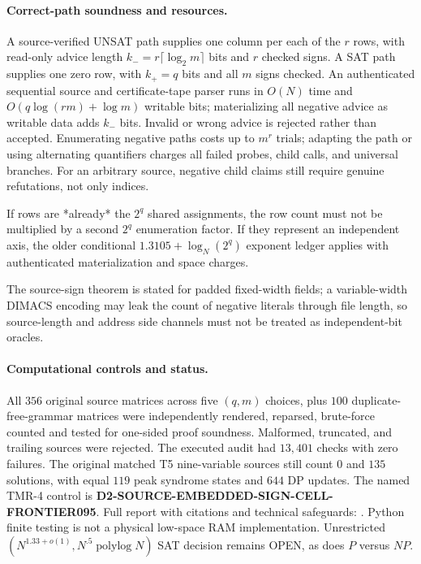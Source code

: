 \documentclass[11pt]{article}
\begin{document}
\paragraph{Correct-path soundness and resources.}
A source-verified UNSAT path supplies one column
per each of the $r$ rows, with read-only advice length
$k_-=r\lceil\log_2m\rceil$ bits and $r$ checked signs.
A SAT path supplies one zero row, with $k_+=q$
bits and all $m$ signs checked. An authenticated
sequential source and certificate-tape parser runs
in $O(N)$ time and $O(q\log(rm)+\log m)$
writable bits; materializing all negative advice
as writable data adds $k_-$ bits. Invalid or wrong
advice is rejected rather than accepted. Enumerating
negative paths costs up to $m^r$ trials; adapting
the path or using alternating quantifiers charges
all failed probes, child calls, and universal branches.
For an arbitrary source, negative child claims still
require genuine refutations, not only indices.

If rows are *already* the $2^q$ shared assignments,
the row count must not be multiplied by a second
$2^q$ enumeration factor. If they represent an
independent axis, the older conditional
$1.3105+\log_N(2^q)$ exponent ledger applies
with authenticated materialization and space charges.

The source-sign theorem is stated for padded fixed-width fields; a variable-width DIMACS encoding may leak the count of negative literals through file length, so source-length and address side channels must not be treated as independent-bit oracles.

\paragraph{Computational controls and status.}
All $356$ original source matrices across five $(q,m)$ choices,
plus $100$ duplicate-free-grammar matrices
were independently rendered, reparsed, brute-force
counted and tested for one-sided proof soundness.
Malformed, truncated, and trailing sources were rejected.
The executed audit had $13{,}401$ checks with zero
failures. The original matched T5 nine-variable sources
still count $0$ and $135$ solutions, with equal
$119$ peak syndrome states and $644$ DP updates.
The named TMR-4 control is
\textbf{D2-SOURCE-EMBEDDED-SIGN-CELL-FRONTIER095}.
Full report with citations and technical safeguards:
.
Python finite testing is not a physical low-space
RAM implementation. Unrestricted
$(N^{1.33+o(1)},N^{.5}\operatorname{polylog}N)$
SAT decision remains OPEN, as does $P$ versus $NP$.
\end{document}
